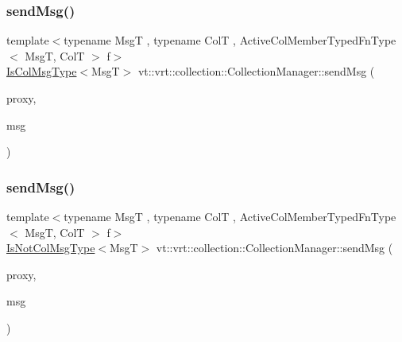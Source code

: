 \mbox{\label{structvt_1_1vrt_1_1collection_1_1_collection_manager_a3ea2d130487c02b8dbda05b7befda88d}} 
\subsubsection{\texorpdfstring{send\+Msg()}{sendMsg()}\hspace{0.1cm}{\footnotesize\ttfamily [5/6]}}
{\footnotesize\ttfamily template$<$typename MsgT , typename ColT , Active\+Col\+Member\+Typed\+Fn\+Type$<$ Msg\+T, Col\+T $>$ f$>$ \\
\hyperlink{structvt_1_1vrt_1_1collection_1_1_collection_manager_a21c21612c806016788057aeab142af20}{Is\+Col\+Msg\+Type}$<$MsgT$>$ vt\+::vrt\+::collection\+::\+Collection\+Manager\+::send\+Msg (\begin{DoxyParamCaption}\item[{\hyperlink{namespacevt_1_1vrt_a620a5c8c59d13e513f690c74b4af516f}{Virtual\+Elm\+Proxy\+Type}$<$ ColT $>$ const \&}]{proxy,  }\item[{MsgT $\ast$}]{msg }\end{DoxyParamCaption})}

\mbox{\label{structvt_1_1vrt_1_1collection_1_1_collection_manager_a229f96a5075562ee92743d69fc285254}} 
\subsubsection{\texorpdfstring{send\+Msg()}{sendMsg()}\hspace{0.1cm}{\footnotesize\ttfamily [6/6]}}
{\footnotesize\ttfamily template$<$typename MsgT , typename ColT , Active\+Col\+Member\+Typed\+Fn\+Type$<$ Msg\+T, Col\+T $>$ f$>$ \\
\hyperlink{structvt_1_1vrt_1_1collection_1_1_collection_manager_ae376deeefd4f89a0b1c93849977715d9}{Is\+Not\+Col\+Msg\+Type}$<$MsgT$>$ vt\+::vrt\+::collection\+::\+Collection\+Manager\+::send\+Msg (\begin{DoxyParamCaption}\item[{\hyperlink{namespacevt_1_1vrt_a620a5c8c59d13e513f690c74b4af516f}{Virtual\+Elm\+Proxy\+Type}$<$ ColT $>$ const \&}]{proxy,  }\item[{MsgT $\ast$}]{msg }\end{DoxyParamCaption})}

